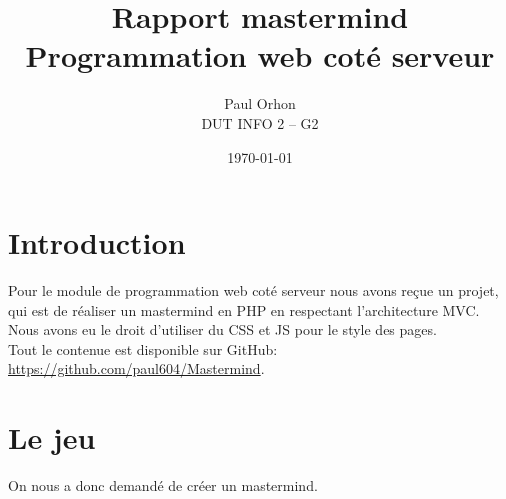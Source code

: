 \documentclass{article}
\title{Rapport mastermind\\
\normalsize Programmation web coté serveur}
\date{\today}
\author{Paul Orhon\\
\small DUT INFO 2 -- G2 }
\begin{document}
\maketitle
\tableofcontents

\clearpage

\section{Introduction}
Pour le module de programmation web coté serveur nous avons reçue un projet, qui est de réaliser un mastermind en PHP en respectant l'architecture MVC. Nous avons eu le droit d'utiliser du CSS et JS pour le style des pages.\\
Tout le contenue est disponible sur GitHub: \url{https://github.com/paul604/Mastermind}.

\section{Le jeu}
    On nous a donc demandé de créer un mastermind.
\end{document}
